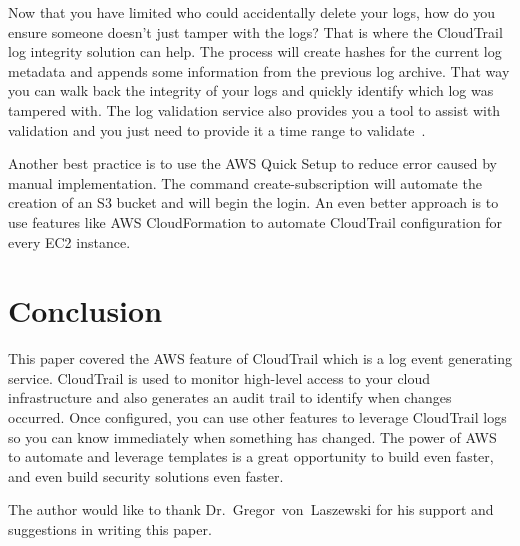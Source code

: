Now that you have limited who could accidentally delete your logs, how do you 
ensure someone doesn’t just tamper with the logs? That is where the CloudTrail 
log integrity solution can help. The process will create hashes for the current 
log metadata and appends some information from the previous log archive. That 
way you can walk back the integrity of your logs and quickly identify which log 
was tampered with. The log validation service also provides you a tool to
 assist with validation and you just need to provide it a time range to 
validate~\cite{hid-sp18-518-CloudTrail-log-sharing}.

Another best practice is to use the AWS Quick Setup to reduce error caused by 
manual implementation. The command create-subscription will automate the 
creation of an S3 bucket and will begin the login. An even better approach is 
to use features like AWS CloudFormation to automate CloudTrail configuration 
for every EC2 instance.

\section{Conclusion}

This paper covered the AWS feature of CloudTrail which is a log event 
generating service. CloudTrail is used to monitor high-level access to your 
cloud infrastructure and also generates an audit trail to identify when changes 
occurred. Once configured, you can use other features to leverage CloudTrail 
logs so you can know immediately when something has changed. The power of AWS 
to automate and leverage templates is a great opportunity to build even faster, 
and even build security solutions even faster.

\begin{acks}

The author would like to thank Dr.~Gregor~von~Laszewski for his support and 
suggestions in writing this paper.

\end{acks}


 

